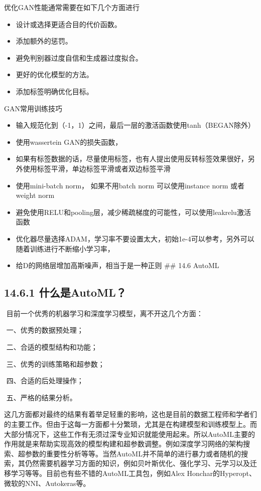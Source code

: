 优化GAN性能通常需要在如下几个方面进行

\begin{itemize}
\item
  设计或选择更适合目的代价函数。
\item
  添加额外的惩罚。
\item
  避免判别器过度自信和生成器过度拟合。
\item
  更好的优化模型的方法。
\item
  添加标签明确优化目标。
\end{itemize}

GAN常用训练技巧

\begin{itemize}
\item
  输入规范化到（-1，1）之间，最后一层的激活函数使用tanh（BEGAN除外）
\item
  使用wassertein GAN的损失函数，
\item
  如果有标签数据的话，尽量使用标签，也有人提出使用反转标签效果很好，另外使用标签平滑，单边标签平滑或者双边标签平滑
\item
  使用mini-batch norm， 如果不用batch norm 可以使用instance norm
  或者weight norm
\item
  避免使用RELU和pooling层，减少稀疏梯度的可能性，可以使用leakrelu激活函数
\item
  优化器尽量选择ADAM，学习率不要设置太大，初始1e-4可以参考，另外可以随着训练进行不断缩小学习率，
\item
  给D的网络层增加高斯噪声，相当于是一种正则 \#\# 14.6 AutoML
\end{itemize}

\subsection{14.6.1 什么是AutoML？}\label{ux4ec0ux4e48ux662fautoml}

​ 目前一个优秀的机器学习和深度学习模型，离不开这几个方面：

​ 一、优秀的数据预处理；

​ 二、合适的模型结构和功能；

​ 三、优秀的训练策略和超参数；

​ 四、合适的后处理操作；

​ 五、严格的结果分析。

​
这几方面都对最终的结果有着举足轻重的影响，这也是目前的数据工程师和学者们的主要工作。但由于这每一方面都十分繁琐，尤其是在构建模型和训练模型上。而大部分情况下，这些工作有无须过深专业知识就能使用起来。所以AutoML主要的作用就是来帮助实现高效的模型构建和超参数调整。例如深度学习网络的架构搜索、超参数的重要性分析等等。当然AutoML并不简单的进行暴力或者随机的搜索，其仍然需要机器学习方面的知识，例如贝叶斯优化、强化学习、元学习以及迁移学习等等。目前也有些不错的AutoML工具包，例如Alex
Honchar的Hyperopt、微软的NNI、Autokeras等。

